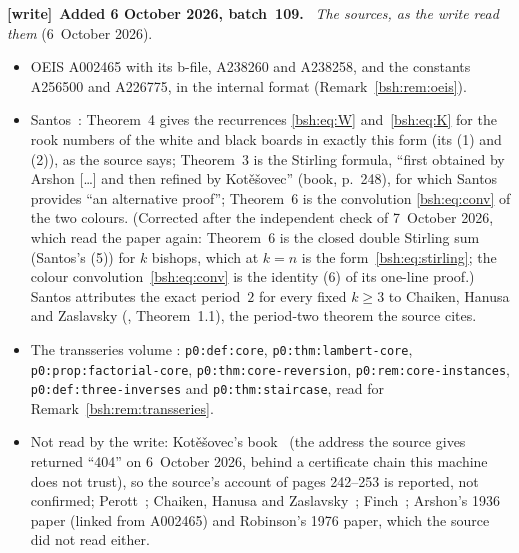 \documentclass[11pt,letterpaper]{article}
\theoremstyle{remark}\newtheorem{remark}[theorem]{Remark}
\newcommand{\file}[1]{\nolinkurl{#1}}
\newenvironment{writenote}[1][]{\par\smallskip\begingroup\small
 \noindent\textbf{[write]}\if\relax\detokenize{#1}\relax\else~\textbf{#1.}\fi\ }%
 {\par\endgroup\smallskip}
\begin{document}
\begin{writenote}[Added 6 October 2026, batch~109]
\emph{The sources, as the write read them} (6~October 2026).
\begin{itemize}\raggedright
\item OEIS A002465 with its b-file, A238260 and A238258, and the constants
 A256500 and A226775, in the internal format (Remark~\ref{bsh:rem:oeis}).
\item Santos~\cite{santos}: Theorem~4 gives the recurrences
 \eqref{bsh:eq:W} and~\eqref{bsh:eq:K} for the rook numbers of the white
 and black boards in exactly this form (its (1) and (2)), as the source
 says; Theorem~3 is the Stirling formula, ``first obtained by Arshon [\dots]
 and then refined by Kot\v e\v sovec'' (book, p.~248), for which Santos
 provides ``an alternative proof''; Theorem~6 is the convolution
 \eqref{bsh:eq:conv} of the two colours. \textup{(Corrected after the
 independent check of 7~October 2026, which read the paper again: Theorem~6
 is the closed double Stirling sum (Santos's (5)) for $k$ bishops, which at
 $k=n$ is the form~\eqref{bsh:eq:stirling}; the colour
 convolution~\eqref{bsh:eq:conv} is the identity (6) of its one-line proof.)}
 Santos attributes the exact
 period~$2$ for every fixed $k\ge3$ to Chaiken, Hanusa and Zaslavsky
 (\cite{period}, Theorem~1.1), the period-two theorem the source cites.
\item The transseries volume
 :
 \file{p0:def:core}, \file{p0:thm:lambert-core},
 \file{p0:prop:factorial-core}, \file{p0:thm:core-reversion},
 \file{p0:rem:core-instances}, \file{p0:def:three-inverses} and
 \file{p0:thm:staircase}, read for Remark~\ref{bsh:rem:transseries}.
\item Not read by the write: Kot\v e\v sovec's book~\cite{kotesovec} (the
 address the source gives returned ``404'' on 6~October 2026, behind a
 certificate chain this machine does not trust), so the source's account
 of pages 242--253 is reported, not confirmed; Perott~\cite{perott};
 Chaiken, Hanusa and Zaslavsky~\cite{favorite,period}; Finch~\cite{finch};
 Arshon's 1936 paper (linked from A002465) and Robinson's 1976 paper, which
 the source did not read either.
\end{itemize}


\end{writenote}
\end{document}
